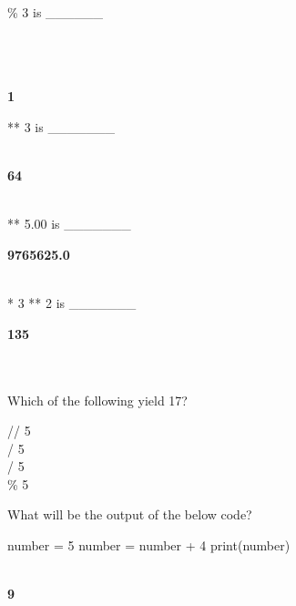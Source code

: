 \documentclass{exam}
\begin{document}
\begin{questions}
     \% 3  is \_\_\_\_\_\_

    \begin{oneparchoices}
         \\
         \\
         \\
        \choice \textbf{1}
    \end{oneparchoices}

     ** 3 is \_\_\_\_\_\_\_

    \begin{oneparchoices}
         \\
        \choice \textbf{64} \\
         \\
    \end{oneparchoices}

     ** 5.00 is \_\_\_\_\_\_\_

    \begin{oneparchoices}
        \choice \textbf{9765625.0} \\
         \\
    \end{oneparchoices}

     * 3 ** 2 is \_\_\_\_\_\_\_

    \begin{oneparchoices}
        \choice \textbf{135} \\
         \\
         \\
    \end{oneparchoices}

    \question Which of the following yield 17?

    \begin{oneparchoices}
         // 5 \\
         / 5 \\
         / 5 \\
         \% 5
    \end{oneparchoices}

    \question What will be the output of the below code? 

    number = 5
    number = number + 4
    print(number)

    \begin{oneparchoices}
         \\
        \choice \textbf{9}
    \end{oneparchoices}


\end{questions}
\end{document}
